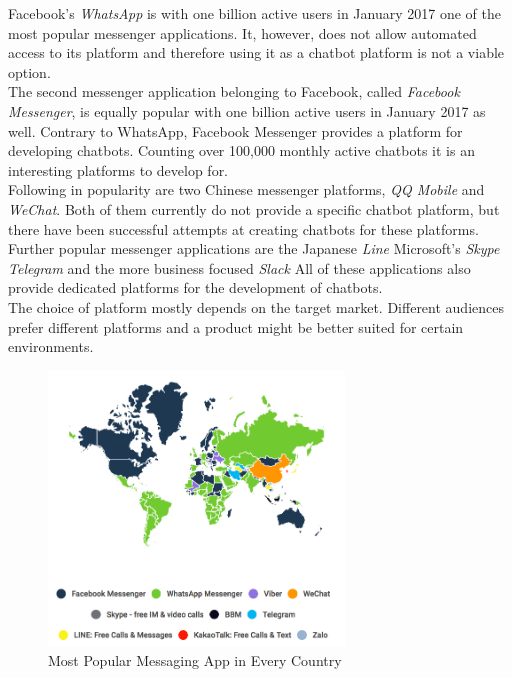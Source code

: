 Facebook's \emph{WhatsApp} is with one billion active users in January 2017\cite{fbpopular} one of the most popular messenger applications. It, however, does not allow automated access to its platform and therefore using it as a chatbot platform is not a viable option.
\\

The second messenger application belonging to Facebook, called \emph{Facebook Messenger}, is equally popular with one billion active users in January 2017\cite{fbpopular} as well. Contrary to WhatsApp, Facebook Messenger provides a platform for developing chatbots. Counting over 100,000 monthly active chatbots\cite{messenger} it is an interesting platforms to develop for.
\\

Following in popularity\cite{appusage} are two Chinese messenger platforms, \emph{QQ Mobile} and \emph{WeChat}. Both of them currently do not provide a specific chatbot platform, but there have been successful attempts at creating chatbots for these platforms\cite{wechatbot}.
\\

Further popular messenger applications are the Japanese \emph{Line} Microsoft's \emph{Skype} \emph{Telegram} and the more business focused \emph{Slack} All of these applications also provide dedicated platforms for the development of chatbots.
\\

The choice of platform mostly depends on the target market. Different audiences prefer different platforms and a product might be better suited for certain environments.

\begin{figure}[H]
	\centering
	\includegraphics[width=0.7\textwidth]{images/similarweb-messenger-by-country.png}
	\caption{Most Popular Messaging App in Every Country\cite{similarweb}}
	\label{fig:similarweb}
\end{figure}

